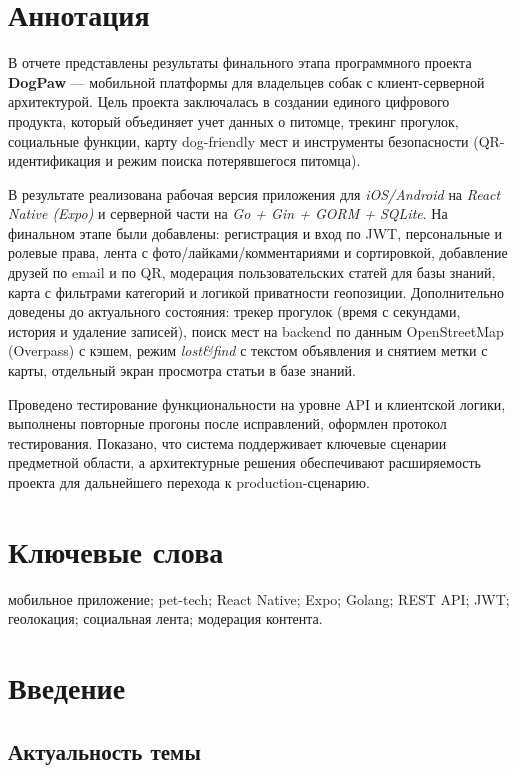 \documentclass[12pt,a4paper]{article}
\begin{document}
\tableofcontents
\clearpage

\section*{Аннотация}

В отчете представлены результаты финального этапа программного проекта \textbf{DogPaw} --- мобильной платформы для владельцев собак с клиент-серверной архитектурой. Цель проекта заключалась в создании единого цифрового продукта, который объединяет учет данных о питомце, трекинг прогулок, социальные функции, карту dog-friendly мест и инструменты безопасности (QR-идентификация и режим поиска потерявшегося питомца). 

В результате реализована рабочая версия приложения для \textit{iOS/Android} на \textit{React Native (Expo)} и серверной части на \textit{Go + Gin + GORM + SQLite}. На финальном этапе были добавлены: регистрация и вход по JWT, персональные и ролевые права, лента с фото/лайками/комментариями и сортировкой, добавление друзей по email и по QR, модерация пользовательских статей для базы знаний, карта с фильтрами категорий и логикой приватности геопозиции. Дополнительно доведены до актуального состояния: трекер прогулок (время с секундами, история и удаление записей), поиск мест на backend по данным OpenStreetMap (Overpass) с кэшем, режим \textit{lost\&find} с текстом объявления и снятием метки с карты, отдельный экран просмотра статьи в базе знаний.

Проведено тестирование функциональности на уровне API и клиентской логики, выполнены повторные прогоны после исправлений, оформлен протокол тестирования. Показано, что система поддерживает ключевые сценарии предметной области, а архитектурные решения обеспечивают расширяемость проекта для дальнейшего перехода к production-сценарию.

\section*{Ключевые слова}
мобильное приложение; pet-tech; React Native; Expo; Golang; REST API; JWT; геолокация; социальная лента; модерация контента.


\section{Введение}

\subsection{Актуальность темы}
\end{document}
